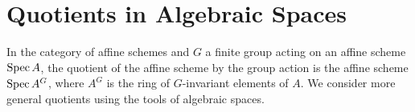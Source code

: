 \section{Quotients in Algebraic Spaces}\label{sec: quotients in algebraic spaces}
In the category of affine schemes and $G$ a finite group acting on an affine scheme $\operatorname{Spec} A$, the quotient of the affine scheme by the group action is the affine scheme $\operatorname{Spec} A^{G}$, where $A^{G}$ is the ring of $G$-invariant elements of $A$. We consider more general quotients using the tools of algebraic spaces. 